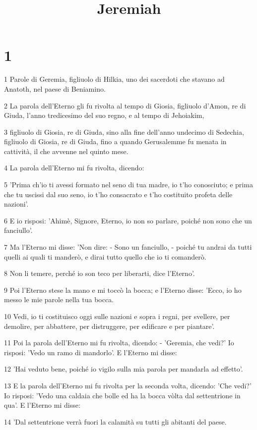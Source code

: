 

\title{Jeremiah}


\chapter{1}

\par 1 Parole di Geremia, figliuolo di Hilkia, uno dei sacerdoti che stavano ad Anatoth, nel paese di Beniamino.
\par 2 La parola dell'Eterno gli fu rivolta al tempo di Giosia, figliuolo d'Amon, re di Giuda, l'anno tredicesimo del suo regno, e al tempo di Jehoiakim,
\par 3 figliuolo di Giosia, re di Giuda, sino alla fine dell'anno undecimo di Sedechia, figliuolo di Giosia, re di Giuda, fino a quando Gerusalemme fu menata in cattività, il che avvenne nel quinto mese.
\par 4 La parola dell'Eterno mi fu rivolta, dicendo:
\par 5 'Prima ch'io ti avessi formato nel seno di tua madre, io t'ho conosciuto; e prima che tu uscissi dal suo seno, io t'ho consacrato e t'ho costituito profeta delle nazioni'.
\par 6 E io risposi: 'Ahimè, Signore, Eterno, io non so parlare, poiché non sono che un fanciullo'.
\par 7 Ma l'Eterno mi disse: 'Non dire: - Sono un fanciullo, - poiché tu andrai da tutti quelli ai quali ti manderò, e dirai tutto quello che io ti comanderò.
\par 8 Non li temere, perché io son teco per liberarti, dice l'Eterno'.
\par 9 Poi l'Eterno stese la mano e mi toccò la bocca; e l'Eterno disse: 'Ecco, io ho messo le mie parole nella tua bocca.
\par 10 Vedi, io ti costituisco oggi sulle nazioni e sopra i regni, per svellere, per demolire, per abbattere, per distruggere, per edificare e per piantare'.
\par 11 Poi la parola dell'Eterno mi fu rivolta, dicendo: - 'Geremia, che vedi?' Io risposi: 'Vedo un ramo di mandorlo'. E l'Eterno mi disse:
\par 12 'Hai veduto bene, poiché io vigilo sulla mia parola per mandarla ad effetto'.
\par 13 E la parola dell'Eterno mi fu rivolta per la seconda volta, dicendo: 'Che vedi?' Io risposi: 'Vedo una caldaia che bolle ed ha la bocca vòlta dal settentrione in qua'. E l'Eterno mi disse:
\par 14 'Dal settentrione verrà fuori la calamità su tutti gli abitanti del paese.
